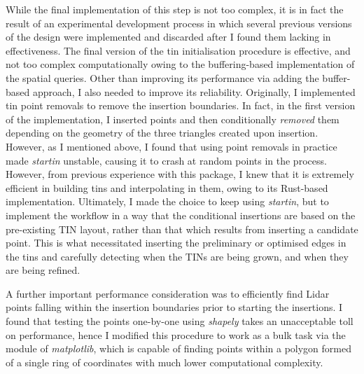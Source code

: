 While the final implementation of this step is not too complex, it is in fact the result of an experimental development process in which several previous versions of the design were implemented and discarded after I found them lacking in effectiveness. The final version of the \ac{tin} initialisation procedure is effective, and not too complex computationally owing to the buffering-based implementation of the spatial queries. Other than improving its performance via adding the buffer-based approach, I also needed to improve its reliability. Originally, I implemented \ac{tin} point removals to remove the insertion boundaries. In fact, in the first version of the implementation, I inserted points and then conditionally \textit{removed} them depending on the geometry of the three triangles created upon insertion. However, as I mentioned above, I found that using point removals in practice made \textit{startin} unstable, causing it to crash at random points in the process. However, from previous experience with this package, I knew that it is extremely efficient in building \ac{tin}s and interpolating in them, owing to its Rust-based implementation. Ultimately, I made the choice to keep using \textit{startin}, but to implement the workflow in a way that the conditional insertions are based on the pre-existing TIN layout, rather than that which results from inserting a candidate point. This is what necessitated inserting the preliminary or optimised edges in the \ac{tin}s and carefully detecting when the TINs are being grown, and when they are being refined.

A further important performance consideration was to efficiently find Lidar points falling within the insertion boundaries prior to starting the insertions. I found that testing the points one-by-one using \textit{shapely} takes an unacceptable toll on performance, hence I modified this procedure to work as a bulk task via the  module of \textit{matplotlib}, which is capable of finding points within a polygon formed of a single ring of coordinates with much lower computational complexity.

